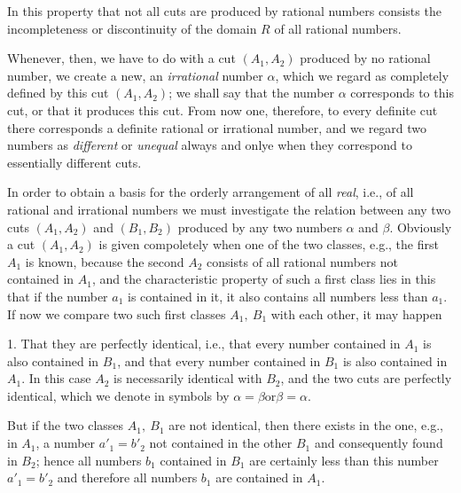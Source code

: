 \documentclass[oneside,12pt]{book}
\begin{document}
In this property that not all cuts are produced by rational numbers consists the incompleteness or discontinuity of the domain $R$ of all rational numbers. \par 

Whenever, then, we have to do with a cut $(A_1,A_2)$ produced by no rational number, we create a new, an \textit{irrational} number $\alpha$, which we regard as completely defined by this cut $(A_1,A_2)$; we shall say that the number $\alpha$ corresponds to this cut, or that it produces this cut. From now one, therefore, to every definite cut there corresponds a definite rational or irrational number, and we regard two numbers as \textit{different} or \textit{unequal} always and onlye when they correspond to essentially different cuts. \par 

In order to obtain a basis for the orderly arrangement of all \textit{real}, i.e., of all rational and irrational numbers we must investigate the relation between any two cuts $(A_1,A_2)$ and $(B_1,B_2)$ produced by any two numbers $\alpha$ and $\beta$. Obviously a cut $(A_1,A_2)$ is given compoletely when one of the two classes, e.g., the first $A_1$ is known, because the second $A_2$ consists of all rational numbers not contained in $A_1$, and the characteristic property of such a first class lies in this that if the number $a_1$ is contained in it, it also contains all numbers less than $a_1$. If now we compare two such first classes $A_1,\ B_1$ with each other, it may happen \par 

1. That they are perfectly identical, i.e., that every number contained in $A_1$ is also contained in $B_1$, and that every number contained in $B_1$ is also contained in $A_1$. In this case $A_2$ is necessarily identical with $B_2$, and the two cuts are perfectly identical, which we denote in symbols by $\alpha = \beta \text{or} \beta = \alpha$. \par 

But if the two classes $A_1,\ B_1$ are not identical, then there exists in the one, e.g., in $A_1$, a number $a'_1=b'_2$ not contained in the other $B_1$ and consequently found in $B_2$; hence all numbers $b_1$ contained in $B_1$ are certainly less than this number $a'_1=b'_2$ and therefore all numbers $b_1$ are contained in $A_1$. \par 
\end{document}
